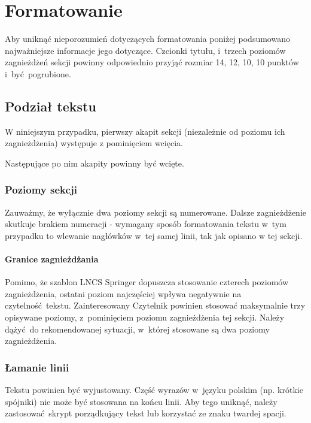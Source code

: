 \section{Formatowanie}
\label{sec:formatting}

Aby uniknąć nieporozumień dotyczących formatowania poniżej podsumowano najważniejsze informacje jego dotyczące. Czcionki tytułu, i~trzech poziomów zagnieżdżeń sekcji powinny odpowiednio przyjąć rozmiar 14, 12, 10, 10 punktów i~być pogrubione.

\subsection{Podział tekstu}
\label{subsec:textDivision}

W niniejszym przypadku, pierwszy akapit sekcji (niezależnie od poziomu ich zagnieżdżenia) występuje z pominięciem wcięcia.

Następujące po nim akapity powinny być wcięte.

\subsubsection{Poziomy sekcji}
\label{subsubsec:levels}

Zauważmy, że wyłącznie dwa poziomy sekcji są numerowane. Dalsze zagnieżdżenie skutkuje brakiem numeracji - wymagany sposób formatowania tekstu w~tym przypadku to wlewanie nagłówków w~tej samej linii, tak jak opisano w tej sekcji.

\paragraph{Granice zagnieżdżania}
\label{par:nestingLimits}

Pomimo, że szablon LNCS Springer dopuszcza stosowanie czterech poziomów zagnieżdżenia, ostatni poziom najczęściej wpływa negatywnie na czytelność tekstu. Zainteresowany Czytelnik powinien stosować maksymalnie trzy opisywane poziomy, z~pominięciem poziomu zagnieżdżenia tej sekcji. Należy dążyć do rekomendowanej sytuacji, w~której stosowane są dwa poziomy zagnieżdżenia.

\subsubsection{Łamanie linii}
\label{subsubsec:linebreak}

Tekstu powinien być wyjustowany. Część wyrazów w~języku polskim (np. krótkie spójniki) nie może być stosowana na końcu linii. Aby tego uniknąć, należy zastosować skrypt porządkujący tekst lub korzystać ze znaku twardej spacji.

